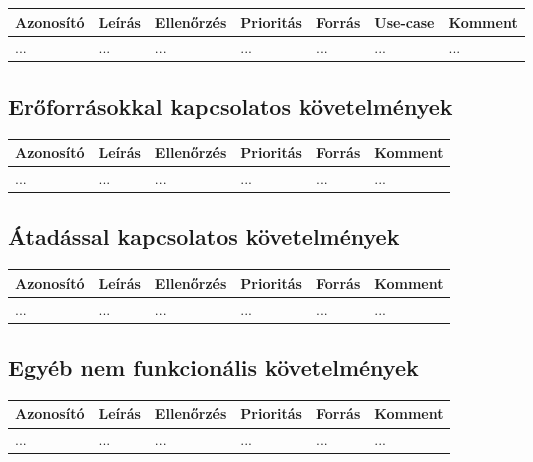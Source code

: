 \begin{longtable}{| l | l | l | l | l | l | l |}
\hline
\textbf{Azonosító}   & \textbf{Leírás} & \textbf{Ellenőrzés} & \textbf{Prioritás} & \textbf{Forrás} & \textbf{Use-case} & \textbf{Komment} \tabularnewline
\hline\hline
... & ... & ... & ... & ... & ... & ... \tabularnewline
\hline
\end{longtable}

\subsection{Erőforrásokkal kapcsolatos követelmények}


\begin{longtable}{| l | l | l | l | l | l |}
\hline
\textbf{Azonosító}   & \textbf{Leírás} & \textbf{Ellenőrzés} & \textbf{Prioritás} & \textbf{Forrás} & \textbf{Komment} \tabularnewline
\hline\hline
... & ... & ... & ... & ... & ... \tabularnewline
\hline
\end{longtable}


\subsection{Átadással kapcsolatos követelmények}

\begin{longtable}{| l | l | l | l | l | l |}
\hline
\textbf{Azonosító}   & \textbf{Leírás} & \textbf{Ellenőrzés} & \textbf{Prioritás} & \textbf{Forrás} & \textbf{Komment} \tabularnewline
\hline\hline
... & ... & ... & ... & ... & ... \tabularnewline
\hline
\end{longtable}

\subsection{Egyéb nem funkcionális követelmények}

\begin{longtable}{| l | l | l | l | l | l |}
\hline
\textbf{Azonosító}   & \textbf{Leírás} & \textbf{Ellenőrzés} & \textbf{Prioritás} & \textbf{Forrás} & \textbf{Komment} \tabularnewline
\hline\hline
... & ... & ... & ... & ... & ... \tabularnewline
\hline
\end{longtable}


